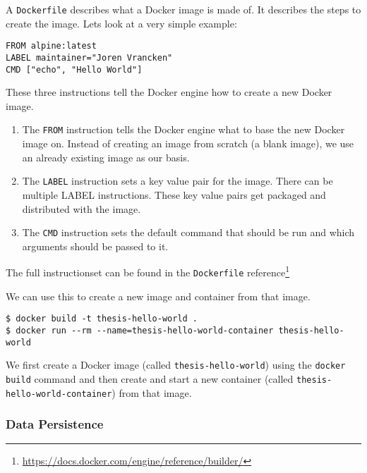 A \lstinline{Dockerfile} describes what a Docker image is made of. It describes the steps to create the image. Lets look at a very simple example:

\hfill

\begin{lstlisting}[caption={Very Basic \lstinline{Dockerfile}},label={dockerfile:simple},captionpos=b]
FROM alpine:latest
LABEL maintainer="Joren Vrancken"
CMD ["echo", "Hello World"]
\end{lstlisting}

\hfill

These three instructions tell the Docker engine how to create a new Docker image.

\begin{enumerate}
    \item The \lstinline{FROM} instruction tells the Docker engine what to base the new Docker image on. Instead of creating an image from scratch (a blank image), we use an already existing image as our basis.

    \item The \lstinline{LABEL} instruction sets a key value pair for the image. There can be multiple LABEL instructions. These key value pairs get packaged and distributed with the image.

    \item The \lstinline{CMD} instruction sets the default command that should be run and which arguments should be passed to it.
\end{enumerate}

The full instructionset can be found in the \lstinline{Dockerfile} reference\footnote{\url{https://docs.docker.com/engine/reference/builder/}}

\hfill

We can use this to create a new image and container from that image.
\begin{lstlisting}[caption={Creating a Docker container from a \lstinline{Dockerfile}},label={docker:container},captionpos=b]
$ docker build -t thesis-hello-world .
$ docker run --rm --name=thesis-hello-world-container thesis-hello-world
\end{lstlisting}

We first create a Docker image (called \lstinline{thesis-hello-world}) using the \lstinline{docker build} command and then create and start a new container (called \lstinline{thesis-hello-world-container}) from that image.

\subsubsection{Data Persistence}

